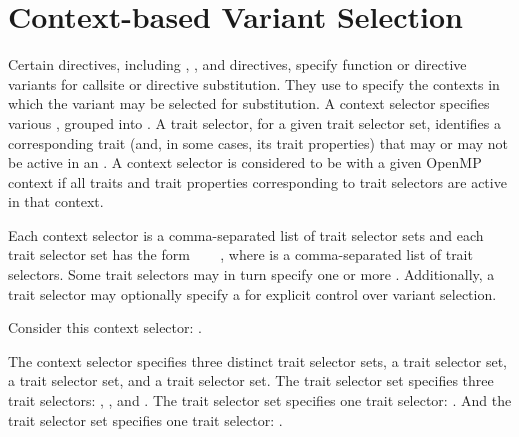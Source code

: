 \section{Context-based Variant Selection}
\label{sec:context_based_variants}



Certain directives, including ,
, and 
directives, specify function or directive variants for callsite or directive
substitution. They use  to specify the contexts in which
the variant may be selected for substitution. A context selector specifies
various , grouped into . A trait
selector, for a given trait selector set, identifies a corresponding trait
(and, in some cases, its trait properties) that may or may not be active in an
. A context selector is considered to be 
with a given OpenMP context if all traits and trait properties corresponding to
trait selectors are active in that context. 

Each context selector is a comma-separated list of trait selector sets and each
trait selector set has the form ~\kcode{=\{}~
~\kcode{\}}, where  is a
comma-separated list of trait selectors. Some trait selectors may in turn
specify one or more . Additionally, a trait selector may
optionally specify a  for explicit control over variant
selection.

Consider this context selector:  
 . 

The context selector specifies three distinct trait selector sets, a
 trait selector set, a  trait selector set, and
a  trait selector set. The  trait selector set
specifies three trait selectors: , , and
. The  trait selector set specifies one trait
selector: . And the  trait selector set
specifies one trait selector: . 

